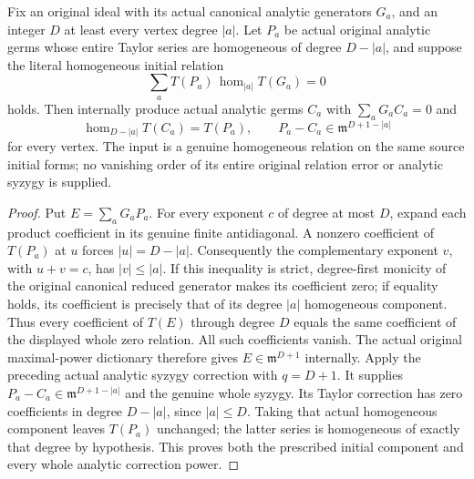 \begin{theorem}
\label{hir:actual-original-homogeneous-initial-analytic-syzygy}
\leanok
Fix an original ideal with its actual canonical analytic generators $G_a$,
and an integer $D$ at least every vertex degree $|a|$. Let $P_a$ be actual
original analytic germs whose entire Taylor series are homogeneous of
degree $D-|a|$, and suppose the literal homogeneous initial relation
\[
 \sum_a T(P_a)\,\operatorname{hom}_{|a|}T(G_a)=0
\]
holds. Then internally produce actual analytic germs $C_a$ with
$\sum_aG_aC_a=0$ and
\[
 \operatorname{hom}_{D-|a|}T(C_a)=T(P_a),\qquad
 P_a-C_a\in\mathfrak m^{D+1-|a|}
\]
for every vertex. The input is a genuine homogeneous relation on the
same source initial forms; no vanishing order of its entire original
relation error or analytic syzygy is supplied.
\end{theorem}
\begin{proof}
Put $E=\sum_aG_aP_a$. For every exponent $c$ of degree at most $D$,
expand each product coefficient in its genuine finite antidiagonal.
A nonzero coefficient of $T(P_a)$ at $u$ forces $|u|=D-|a|$.
Consequently the complementary exponent $v$, with $u+v=c$, has
$|v|\le|a|$. If this inequality is strict, degree-first monicity of
the original canonical reduced generator makes its coefficient zero;
if equality holds, its coefficient is precisely that of its degree
$|a|$ homogeneous component. Thus every coefficient of $T(E)$ through
degree $D$ equals the same coefficient of the displayed whole zero
relation. All such coefficients vanish. The actual original maximal-power
dictionary therefore gives $E\in\mathfrak m^{D+1}$ internally.
Apply the preceding actual analytic syzygy correction with $q=D+1$.
It supplies $P_a-C_a\in\mathfrak m^{D+1-|a|}$ and the genuine whole
syzygy. Its Taylor correction has zero coefficients in degree $D-|a|$,
since $|a|\le D$. Taking that actual homogeneous component leaves
$T(P_a)$ unchanged; the latter series is homogeneous of exactly that
degree by hypothesis. This proves both the prescribed initial component
and every whole analytic correction power.
\end{proof}
